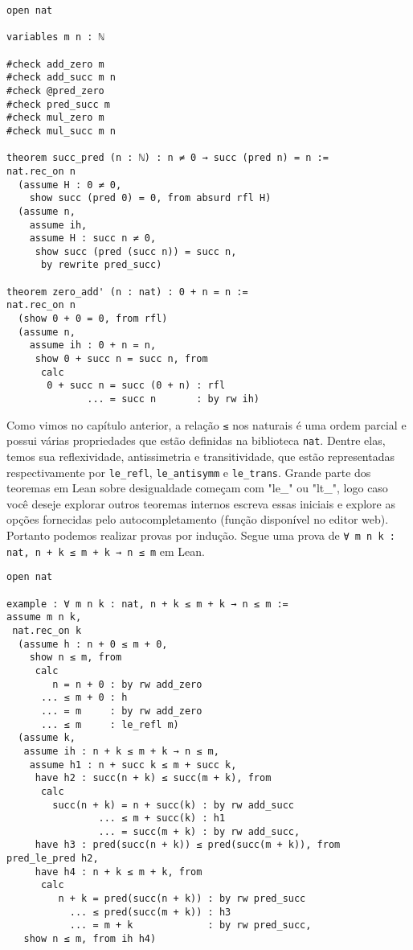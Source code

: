 \begin{lstlisting}
open nat

variables m n : ℕ

#check add_zero m
#check add_succ m n
#check @pred_zero
#check pred_succ m
#check mul_zero m
#check mul_succ m n

theorem succ_pred (n : ℕ) : n ≠ 0 → succ (pred n) = n :=
nat.rec_on n
  (assume H : 0 ≠ 0,
    show succ (pred 0) = 0, from absurd rfl H)
  (assume n,
    assume ih,
    assume H : succ n ≠ 0,
     show succ (pred (succ n)) = succ n,
      by rewrite pred_succ)

theorem zero_add' (n : nat) : 0 + n = n :=
nat.rec_on n
  (show 0 + 0 = 0, from rfl)
  (assume n,
    assume ih : 0 + n = n,
     show 0 + succ n = succ n, from
      calc
       0 + succ n = succ (0 + n) : rfl
              ... = succ n       : by rw ih)
\end{lstlisting}

Como vimos no capítulo anterior, a relação \lstinline{≤} nos naturais é uma ordem parcial e possui várias propriedades que estão definidas na biblioteca \lstinline{nat}. Dentre elas, temos sua reflexividade, antissimetria e transitividade, que estão representadas respectivamente por \lstinline{le_refl}, \lstinline{le_antisymm} e \lstinline{le_trans}. Grande parte dos teoremas em Lean sobre desigualdade começam com "le\_" ou "lt\_", logo caso você deseje explorar outros teoremas internos escreva essas iniciais e explore as opções fornecidas pelo autocompletamento (função disponível no editor web). Portanto podemos realizar provas por indução. Segue uma prova de \lstinline{∀ m n k : nat, n + k ≤ m + k → n ≤ m} em Lean.

\begin{lstlisting}
open nat

example : ∀ m n k : nat, n + k ≤ m + k → n ≤ m := 
assume m n k,
 nat.rec_on k 
  (assume h : n + 0 ≤ m + 0,
    show n ≤ m, from 
     calc
        n = n + 0 : by rw add_zero
      ... ≤ m + 0 : h
      ... = m     : by rw add_zero
      ... ≤ m     : le_refl m)
  (assume k,
   assume ih : n + k ≤ m + k → n ≤ m,
    assume h1 : n + succ k ≤ m + succ k,
     have h2 : succ(n + k) ≤ succ(m + k), from 
      calc
        succ(n + k) = n + succ(k) : by rw add_succ
                ... ≤ m + succ(k) : h1
                ... = succ(m + k) : by rw add_succ,
     have h3 : pred(succ(n + k)) ≤ pred(succ(m + k)), from pred_le_pred h2,
     have h4 : n + k ≤ m + k, from 
      calc
         n + k = pred(succ(n + k)) : by rw pred_succ
           ... ≤ pred(succ(m + k)) : h3
           ... = m + k             : by rw pred_succ, 
   show n ≤ m, from ih h4)
\end{lstlisting}


